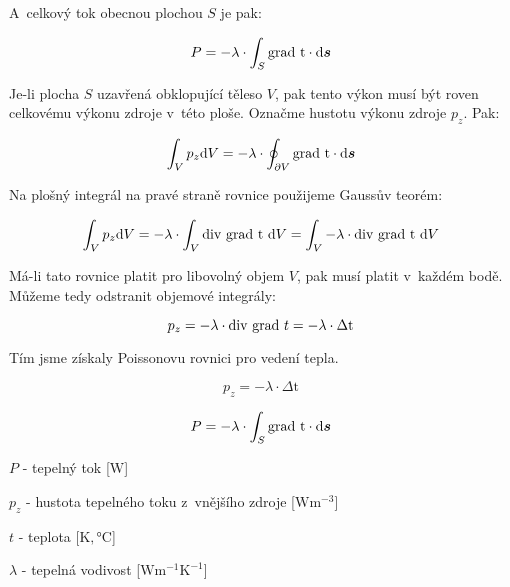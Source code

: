 A~celkový tok obecnou plochou \(S\) je pak:

\begin{equation}
P = -\lambda \cdot \int_{S} \grad \ \mathrm{t} \cdot \mathrm{d}\vect{s} 
\end{equation}

Je-li plocha \(S\) uzavřená obklopující těleso \(V\), pak tento výkon musí být roven celkovému výkonu zdroje v~této ploše. Označme hustotu výkonu zdroje \(p_z\). Pak:

\begin{equation}
\int_{V} p_z \mathrm{d}V = -\lambda \cdot \oint_{\partial V} \mathrm{grad} \ \mathrm{t} \cdot \mathrm{d}\boldsymbol{s} 
\end{equation} 

Na plošný integrál na pravé straně rovnice použijeme Gaussův teorém: 

\begin{equation}
\int_{V} p_z \mathrm{d}V = -\lambda \cdot \int_{V} \mathrm{div} \ \mathrm{grad} \ \mathrm{t} \ \mathrm{d}V = \int_{V} -\lambda \cdot \mathrm{div} \ \mathrm{grad} \ \mathrm{t} \ \mathrm{d}V
\end{equation}

Má-li tato rovnice platit pro libovolný objem \(V\), pak musí platit v~každém bodě. Můžeme tedy odstranit objemové integrály:

\begin{equation}
p_z = -\lambda \cdot \mathrm{div} \ \mathrm{grad} \ t = -\lambda \cdot \Delta \mathrm{t}
\end{equation}

Tím jsme získaly Poissonovu rovnici pro vedení tepla.

\begin{fact}

\begin{equation}
p_z = -\lambda \cdot \Delta \mathrm{t}
\end{equation}

\begin{equation}
P = -\lambda \cdot \int_{S} \grad \ \mathrm{t} \cdot \mathrm{d}\vect{s} 
\end{equation}

\(P\) - tepelný tok [\(\mathrm{W}\)]

\(p_z\) - hustota tepelného toku z~vnějšího zdroje [\(\mathrm{W} \mathrm{m}^{-3}\)]

\(t\) - teplota [\(\mathrm{K}, \si{\degree}\mathrm{C}\)]

\(\lambda\) - tepelná vodivost [\(\mathrm{W} \mathrm{m}^{-1} \mathrm{K}^{-1}\)] 
\end{fact}

